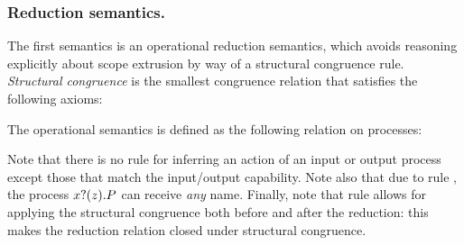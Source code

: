 \documentclass[runningheads]{llncs}
\begin{document}


\subsubsection{Reduction semantics.}
The first semantics is an operational reduction semantics, which avoids reasoning explicitly about scope extrusion by way of a structural congruence rule.
\emph{Structural congruence} is the smallest congruence relation that satisfies the following axioms:


The operational semantics is defined as the following relation on processes:
Note that there is no rule for inferring an action of an input or output process except those that match the input/output capability.
Note also that due to rule , the process \( x ? (z) . P \) can receive \emph{any} name.
Finally, note that rule  allows for applying the structural congruence both before and after the reduction:
this makes the reduction relation closed under structural congruence.
\end{document}
